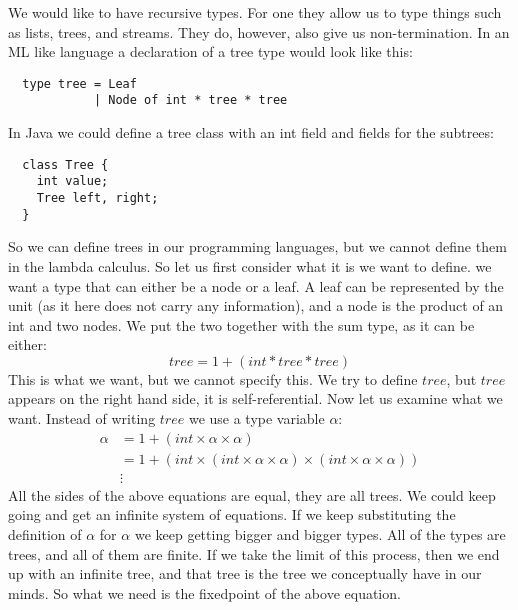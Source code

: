 We would like to have recursive types. For one they allow us to type things such as lists, trees, and streams. They do, however, also give us non-termination. In an ML like language a declaration of a tree type would look like this:
\begin{lstlisting}
  type tree = Leaf
            | Node of int * tree * tree
\end{lstlisting}
In Java we could define a tree class with an int field and fields for the subtrees:
\begin{lstlisting}
  class Tree {
    int value;
    Tree left, right;
  }
\end{lstlisting}
So we can define trees in our programming languages, but we cannot define them in the lambda calculus. So let us first consider what it is we want to define. we want a type that can either be a node or a leaf. A leaf can be represented by the unit (as it here does not carry any information), and a node is the product of an int and two nodes. We put the two together with the sum type, as it can be either:
\[
  tree = 1 + (int * tree * tree)
\]
This is what we want, but we cannot specify this. We try to define $tree$, but $tree$ appears on the right hand side, it is self-referential. Now let us examine what we want. Instead of writing $tree$ we use a type variable $\alpha$:
\begin{align*}
  \alpha &= 1 + (int \times \alpha \times \alpha) \\
         &= 1 + (int \times (int \times \alpha \times \alpha) \times (int \times \alpha \times \alpha)) \\
  &\vdots
\end{align*}
All the sides of the above equations are equal, they are all trees. We could keep going and get an infinite system of equations. If we keep substituting the definition of $\alpha$ for $\alpha$ we keep getting bigger and bigger types. All of the types are trees, and all of them are finite. If we take the limit of this process, then we end up with an infinite tree, and that tree is the tree we conceptually have in our minds. So what we need is the fixedpoint of the above equation.

